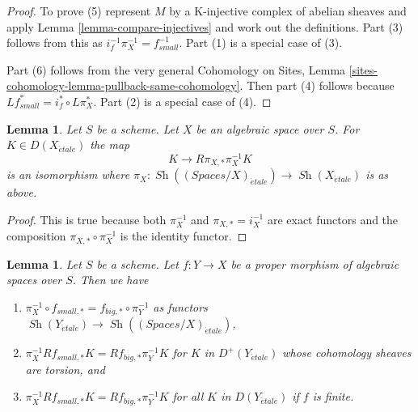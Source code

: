 \documentclass{stacks-project}
\theoremstyle{plain}
\newtheorem{lemma}[subsection]{Lemma}
\theoremstyle{definition}
\theoremstyle{remark}
\numberwithin{equation}{subsection}
\def\Sh{\mathop{\mathit{Sh}}\nolimits}
\def\etale{{\acute{e}tale}}
\begin{document}
\begin{proof}
To prove (5) represent $M$ by a K-injective complex of abelian sheaves
and apply Lemma \ref{lemma-compare-injectives}
and work out the definitions. Part (3) follows from
this as $i_f^{-1}\pi_X^{-1} = f_{small}^{-1}$. Part (1) is a special
case of (3).

\medskip\noindent
Part (6) follows from the very general Cohomology on Sites, Lemma
\ref{sites-cohomology-lemma-pullback-same-cohomology}. Then part
(4) follows because $Lf_{small}^* = i_f^* \circ L\pi_X^*$.
Part (2) is a special case of (4).
\end{proof}

\begin{lemma}
\label{lemma-cohomological-descent-etale}
Let $S$ be a scheme. Let $X$ be an algebraic space over $S$.
For $K \in D(X_\etale)$ the map
$$
K \longrightarrow R\pi_{X, *}\pi_X^{-1}K
$$
is an isomorphism where
$\pi_X : \Sh((\textit{Spaces}/X)_\etale) \to \Sh(X_\etale)$ is as above.
\end{lemma}

\begin{proof}
This is true because both $\pi_X^{-1}$ and $\pi_{X, *} = i_X^{-1}$
are exact functors and the composition $\pi_{X, *} \circ \pi_X^{-1}$
is the identity functor.
\end{proof}

\begin{lemma}
\label{lemma-compare-higher-direct-image-proper}
Let $S$ be a scheme.
Let $f : Y \to X$ be a proper morphism of algebraic spaces over $S$.
Then we have
\begin{enumerate}
\item $\pi_X^{-1} \circ f_{small, *} = f_{big, *} \circ \pi_Y^{-1}$
as functors $\Sh(Y_\etale) \to \Sh((\textit{Spaces}/X)_\etale)$,
\item $\pi_X^{-1}Rf_{small, *}K = Rf_{big, *}\pi_Y^{-1}K$
for $K$ in $D^+(Y_\etale)$ whose cohomology sheaves are torsion, and
\item $\pi_X^{-1}Rf_{small, *}K = Rf_{big, *}\pi_Y^{-1}K$
for all $K$ in $D(Y_\etale)$ if $f$ is finite.
\end{enumerate}
\end{lemma}
\end{document}
